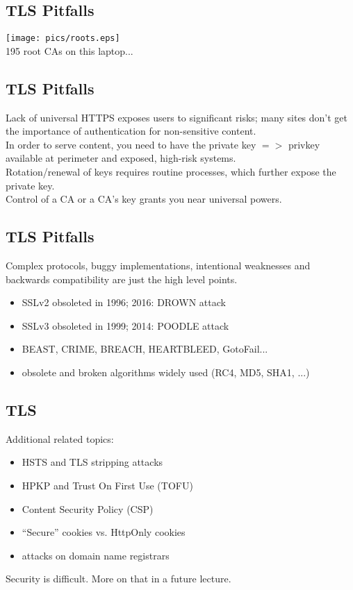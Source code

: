 \documentclass[xga]{xdvislides}
\begin{document}
\subsection{TLS Pitfalls}
\begin{center}
	\texttt{[image: pics/roots.eps]} \\
	195 root CAs on this laptop...
\end{center}

\subsection{TLS Pitfalls}
Lack of universal HTTPS exposes users to significant
risks; many sites don't get the importance of
authentication for non-sensitive content. \\

In order to serve content, you need to have the
private key $ => $ privkey available at perimeter and
exposed, high-risk systems. \\

Rotation/renewal of keys requires routine processes,
which further expose the private key. \\

Control of a CA or a CA's key grants you near
universal powers. \\


\subsection{TLS Pitfalls}
Complex protocols, buggy implementations, intentional
weaknesses and backwards compatibility are just the
high level points.

\begin{itemize}
	\item SSLv2 obsoleted in 1996; 2016: DROWN attack
	\item SSLv3 obsoleted in 1999; 2014: POODLE attack
	\item BEAST, CRIME, BREACH, HEARTBLEED, GotoFail...
	\item obsolete and broken algorithms widely used (RC4, MD5, SHA1, ...)
\end{itemize}

\subsection{TLS}
Additional related topics:
\begin{itemize}
	\item HSTS and TLS stripping attacks
	\item HPKP and Trust On First Use (TOFU)
	\item Content Security Policy (CSP)
	\item ``Secure'' cookies vs. HttpOnly cookies
	\item attacks on domain name registrars
\end{itemize}
\addvspace{.5in}
Security is difficult.  More on that in a future
lecture.
\end{document}
